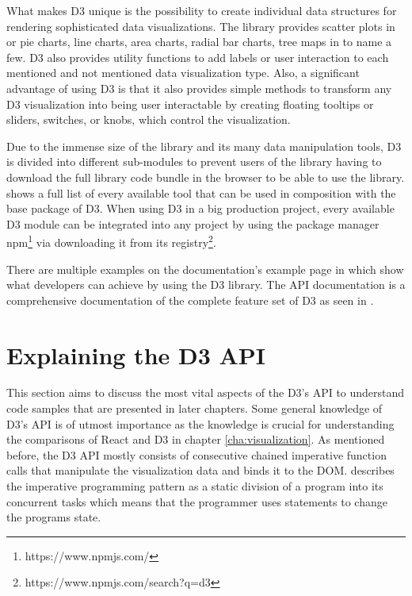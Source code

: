 What makes D3 unique is the possibility to create individual data structures for rendering sophisticated data visualizations. The library provides scatter plots in \cite[/d3-scale]{D3Github} or pie charts, line charts, area charts, radial bar charts, tree maps in \cite[/d3-shape]{D3Github} to name a few. D3 also provides utility functions to add labels or user interaction to each mentioned and not mentioned data visualization type. Also, a significant advantage of using D3 is that it also provides simple methods to transform any D3 visualization into being user interactable by creating floating tooltips or sliders, switches, or knobs, which control the visualization.

Due to the immense size of the library and its many data manipulation tools, D3 is divided into different sub-modules to prevent users of the library having to download the full library code bundle in the browser to be able to use the library. \cite{D3Github} shows a full list of every available tool that can be used in composition with the base package of D3. When using D3 in a big production project, every available D3 module can be integrated into any project by using the package manager npm\footnote{https://www.npmjs.com/} via downloading it from its registry\footnote{https://www.npmjs.com/search?q=d3}.

\begin{emergency}{1em}
There are multiple examples on the documentation's example page in \cite{D3Examples} which show what developers can achieve by using the D3 library. The API documentation is a comprehensive documentation of the complete feature set of D3 as seen in \cite[\mbox{/d3/blob/master/API.md}]{D3Github}.
\end{emergency}


\section{Explaining the D3 API} 

This section aims to discuss the most vital aspects of the D3's API to understand code samples that are presented in later chapters. Some general knowledge of D3's API is of utmost importance as the knowledge is crucial for understanding the comparisons of React and D3 in chapter \ref{cha:visualization}. As mentioned before, the D3 API mostly consists of consecutive chained imperative function calls that manipulate the visualization data and binds it to the DOM. \cite[P.\ 625]{prgLngDesignImpl} describes the imperative programming pattern as a static division of a program into its concurrent tasks which means that the programmer uses statements to change the programs state. 

